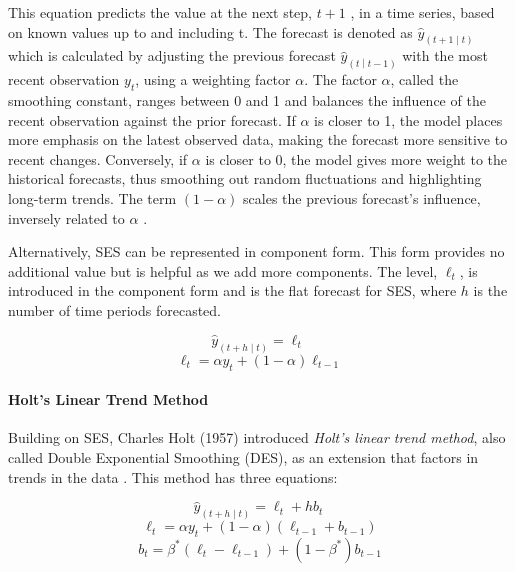 \documentclass[12pt,a4paper]{article}
\begin{document}
This equation predicts the value at the next step,  $t+1$ , in a time series, based on known values up to and including t. The forecast is denoted as ${\hat{y}}_{\left(t+1\middle| t\right)}$ which is calculated by adjusting the previous forecast ${\hat{y}}_{\left(t\middle| t-1\right)}$ with the most recent observation $y_t$, using a weighting factor $\alpha$. The factor $\alpha$, called the smoothing constant, ranges between 0 and 1 and balances the influence of the recent observation against the prior forecast. If $\alpha$ is closer to 1, the model places more emphasis on the latest observed data, making the forecast more sensitive to recent changes. Conversely, if $\alpha$ is closer to 0, the model gives more weight to the historical forecasts, thus smoothing out random fluctuations and highlighting long-term trends. The term $(1 - \alpha)$ scales the previous forecast's influence, inversely related to $\alpha$ \parencite{HyndmanForecasting2021}. 

Alternatively, SES can be represented in component form. This form provides no additional value but is helpful as we add more components. The level, $\ell_t$, is introduced in the component form and is the flat forecast for SES, where $h$ is the number of time periods forecasted. 

\begin{equation}
  {\hat{y}}_{\left(t+h\middle| t\right)}=\ell_t\ 
  \label{sescomponent}
\end{equation}
\begin{equation}
  \ell_t=\alpha y_t+\left(1-\alpha\right)\ell_{t-1}
  \label{level}
\end{equation}


\paragraph{Holt’s Linear Trend Method}
Building on SES, Charles Holt (1957) introduced \textit{Holt’s linear trend method}, also called Double Exponential Smoothing (DES), as an extension that factors in trends in the data \parencite{HyndmanForecasting2021}. This method has three equations:

\begin{equation}
  {\hat{y}}_{\left(t+h\middle| t\right)}=\ell_t+hb_t\ 
  \label{holt}
\end{equation}
\begin{equation}
  \ell_t=\alpha y_t+\left(1-\alpha\right)\left(\ell_{t-1}+b_{t-1}\right)
  \label{levelholt}
\end{equation}
\begin{equation}
  b_t=\beta^\ast\left(\ell_t-\ell_{t-1}\right)+\left(1-\beta^\ast\right)b_{t-1}
  \label{trend}
\end{equation}
\end{document}
